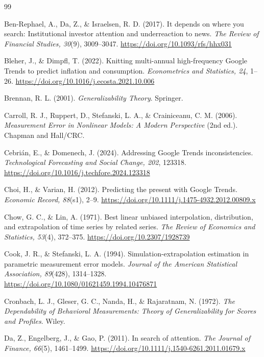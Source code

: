 \documentclass[12pt,a4paper,oneside]{article}
\begin{document}
\begin{thebibliography}{99}

Ben-Rephael, A., Da, Z., \& Israelsen, R. D. (2017).
It depends on where you search: Institutional investor attention and underreaction to news.
\textit{The Review of Financial Studies, 30}(9), 3009--3047.
\url{https://doi.org/10.1093/rfs/hhx031}

Bleher, J., \& Dimpfl, T. (2022).
Knitting multi-annual high-frequency Google Trends to predict inflation and consumption.
\textit{Econometrics and Statistics, 24}, 1--26.
\url{https://doi.org/10.1016/j.ecosta.2021.10.006}

Brennan, R. L. (2001).
\textit{Generalizability Theory}.
Springer.

Carroll, R. J., Ruppert, D., Stefanski, L. A., \& Crainiceanu, C. M. (2006).
\textit{Measurement Error in Nonlinear Models: A Modern Perspective} (2nd ed.).
Chapman and Hall/CRC.

Cebrián, E., \& Domenech, J. (2024).
Addressing Google Trends inconsistencies.
\textit{Technological Forecasting and Social Change, 202}, 123318.
\url{https://doi.org/10.1016/j.techfore.2024.123318}

Choi, H., \& Varian, H. (2012).
Predicting the present with Google Trends.
\textit{Economic Record, 88}(s1), 2--9.
\url{https://doi.org/10.1111/j.1475-4932.2012.00809.x}

Chow, G. C., \& Lin, A. (1971).
Best linear unbiased interpolation, distribution, and extrapolation of time series by related series.
\textit{The Review of Economics and Statistics, 53}(4), 372--375.
\url{https://doi.org/10.2307/1928739}

Cook, J. R., \& Stefanski, L. A. (1994).
Simulation-extrapolation estimation in parametric measurement error models.
\textit{Journal of the American Statistical Association, 89}(428), 1314--1328.
\url{https://doi.org/10.1080/01621459.1994.10476871}

Cronbach, L. J., Gleser, G. C., Nanda, H., \& Rajaratnam, N. (1972).
\textit{The Dependability of Behavioral Measurements: Theory of Generalizability for Scores and Profiles}.
Wiley.

Da, Z., Engelberg, J., \& Gao, P. (2011).
In search of attention.
\textit{The Journal of Finance, 66}(5), 1461--1499.
\url{https://doi.org/10.1111/j.1540-6261.2011.01679.x}


\end{thebibliography}
\end{document}
